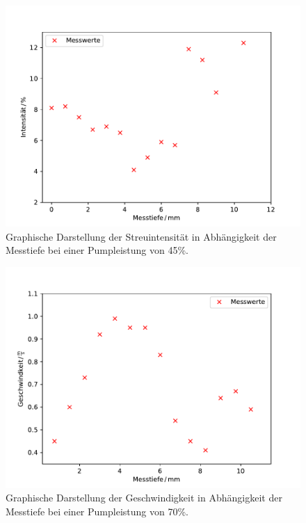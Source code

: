     \begin{figure}
        \centering
        \includegraphics[scale=0.6]{pump45.pdf}
        \caption{Graphische Darstellung der Streuintensität in Abhängigkeit der Messtiefe bei einer Pumpleistung von 45\%.}
        \label{fig:pump45}
      \end{figure}
      \begin{figure}
          \centering
          \includegraphics[scale=0.6]{pump70v.pdf}
          \caption{Graphische Darstellung der Geschwindigkeit in Abhängigkeit der Messtiefe bei einer Pumpleistung von 70\%.}
          \label{fig:pump70v}
        \end{figure}
